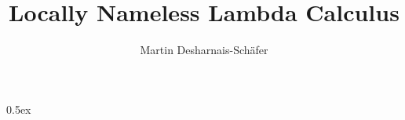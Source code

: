 \documentclass[11pt,a4paper]{article}
\begin{document}
\title{Locally Nameless Lambda Calculus}
\author{Martin Desharnais-Schäfer}
\maketitle

\tableofcontents

\parindent 0pt\parskip 0.5ex



%
%
\end{document}

